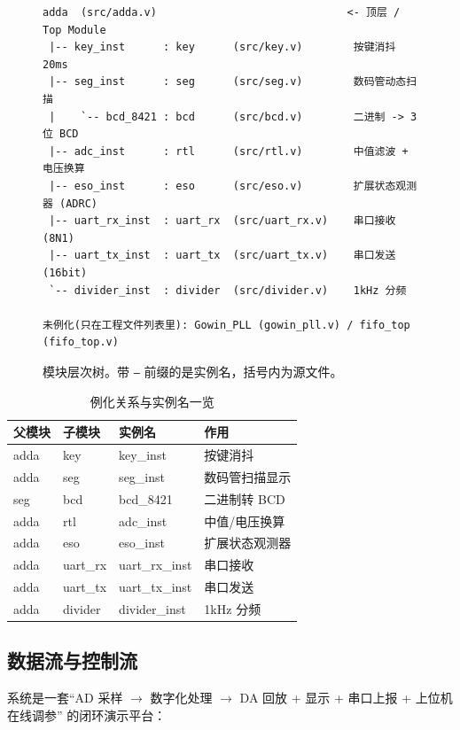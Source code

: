 \begin{figure}[htbp]
\centering
\begin{minipage}{0.9\linewidth}
\begin{verbatim}
adda  (src/adda.v)                              <- 顶层 / Top Module
 |-- key_inst      : key      (src/key.v)        按键消抖 20ms
 |-- seg_inst      : seg      (src/seg.v)        数码管动态扫描
 |    `-- bcd_8421 : bcd      (src/bcd.v)        二进制 -> 3 位 BCD
 |-- adc_inst      : rtl      (src/rtl.v)        中值滤波 + 电压换算
 |-- eso_inst      : eso      (src/eso.v)        扩展状态观测器 (ADRC)
 |-- uart_rx_inst  : uart_rx  (src/uart_rx.v)    串口接收 (8N1)
 |-- uart_tx_inst  : uart_tx  (src/uart_tx.v)    串口发送 (16bit)
 `-- divider_inst  : divider  (src/divider.v)    1kHz 分频

未例化(只在工程文件列表里): Gowin_PLL (gowin_pll.v) / fifo_top (fifo_top.v)
\end{verbatim}
\end{minipage}
\caption{模块层次树。带 \texttt{--} 前缀的是实例名，括号内为源文件。}
\label{fig:hier}
\end{figure}

\begin{table}[htbp]
\centering
\small
\caption{例化关系与实例名一览}
\begin{tabular}{llll}
\toprule
父模块 & 子模块 & 实例名 & 作用\\
\midrule
adda & key & key\_inst & 按键消抖 \\
adda & seg & seg\_inst & 数码管扫描显示 \\
seg & bcd & bcd\_8421 & 二进制转 BCD \\
adda & rtl & adc\_inst & 中值/电压换算 \\
adda & eso & eso\_inst & 扩展状态观测器 \\
adda & uart\_rx & uart\_rx\_inst & 串口接收 \\
adda & uart\_tx & uart\_tx\_inst & 串口发送 \\
adda & divider & divider\_inst & 1kHz 分频 \\
\bottomrule
\end{tabular}
\end{table}

\subsection{数据流与控制流}

系统是一套“AD 采样 $\rightarrow$ 数字化处理 $\rightarrow$ DA 回放 + 显示 + 串口上报 + 上位机在线调参”
的闭环演示平台：

